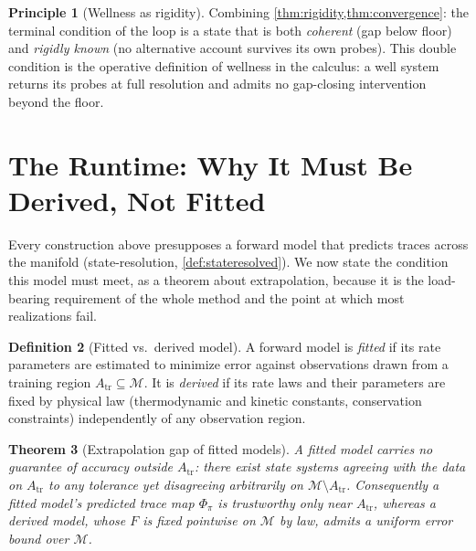 \documentclass[11pt,a4paper]{article}
\theoremstyle{thmstyle}
\newtheorem{theorem}{Theorem}[section]
\theoremstyle{definition}
\newtheorem{definition}[theorem]{Definition}
\newtheorem{principle}[theorem]{Principle}
\theoremstyle{remark}
\newcommand{\Man}{\mathcal{M}}          %
\newcommand{\fld}{F}                    %
\newcommand{\probe}{\pi}                %
\begin{document}
\begin{principle}[Wellness as rigidity]
\label{prin:wellness}
Combining \cref{thm:rigidity,thm:convergence}: the terminal condition of
the loop is a state that is both \emph{coherent} (gap below floor) and
\emph{rigidly known} (no alternative account survives its own probes). This
double condition is the operative definition of wellness in the calculus:
a well system returns its probes at full resolution and admits no
gap-closing intervention beyond the floor.
\end{principle}

\section{The Runtime: Why It Must Be Derived, Not Fitted}
\label{sec:runtime}

Every construction above presupposes a forward model that predicts traces
across the manifold (state-resolution, \cref{def:stateresolved}). We now
state the condition this model must meet, as a theorem about
extrapolation, because it is the load-bearing requirement of the whole
method and the point at which most realizations fail.

\begin{definition}[Fitted vs.\ derived model]
\label{def:fitvsder}
A forward model is \emph{fitted} if its rate parameters are estimated to
minimize error against observations drawn from a training region
$A_{\mathrm{tr}}\subseteq\Man$. It is \emph{derived} if its rate laws and
their parameters are fixed by physical law (thermodynamic and kinetic
constants, conservation constraints) independently of any observation
region.
\end{definition}

\begin{theorem}[Extrapolation gap of fitted models]
\label{thm:extrap}
A fitted model carries no guarantee of accuracy outside
$A_{\mathrm{tr}}$: there exist state systems agreeing with the data on
$A_{\mathrm{tr}}$ to any tolerance yet disagreeing arbitrarily on
$\Man\setminus A_{\mathrm{tr}}$. Consequently a fitted model's predicted
trace map $\Phi_\probe$ is trustworthy only near $A_{\mathrm{tr}}$, whereas
a derived model, whose $\fld$ is fixed pointwise on $\Man$ by law, admits a
uniform error bound over $\Man$.
\end{theorem}
\end{document}
